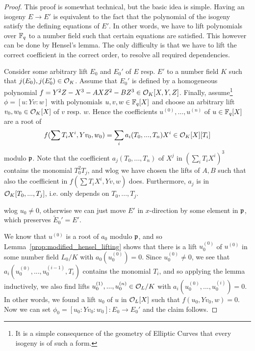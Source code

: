 \begin{proof}
    This proof is somewhat technical, but the basic idea is simple.
    Having an isogeny $E \to E'$ is equivalent to the fact that the polynomial of the isogeny satisfy the defining equations of $E'$.
    In other words, we have to lift polynomials over $\mathbb{F}_q$ to a number field such that certain equations are satisfied.
    This however can be done by Hensel's lemma.
    The only difficulty is that we have to lift the correct coefficient in the correct order, to resolve all required dependencies.

    Consider some arbitrary lift $E_0$ and $E_0'$ of $E$ resp. $E'$ to a number field $K$ such that $j(E_0), j(E_0') \in \mathcal{O}_K$.
    Assume that $E_0'$ is defined by a homogeneous polynomial $f = Y^2Z - X^3 - AXZ^2 - BZ^3 \in \mathcal{O}_K[X, Y, Z]$.
    Finally, assume\footnote{It is a simple consequence of the geometry of Elliptic Curves that every isogeny is of such a form.} $\phi = [u : Y v : w]$ with polynomials $u, v, w \in \mathbb{F}_q[X]$ and choose an arbitrary lift $v_0, w_0 \in \mathcal{O}_K[X]$ of $v$ resp. $w$.
    Hence the coefficients $u^{(0)}, ..., u^{(n)}$ of $u \in \mathbb{F}_q[X]$ are a root of
    \begin{equation*}
        f(\sum T_i X^i, Y v_0, w_0) = \sum_i a_i(T_0, ..., T_n) X^i \in \mathcal{O}_K[X][T_i]
    \end{equation*}
    modulo $\mathfrak{p}$.
    Note that the coefficient $a_j(T_0, ..., T_n)$ of $X^j$ in $(\sum_i T_i X^i)^3$ contains the monomial $T_0^2 T_j$, and 
    wlog we have chosen the lifts of $A, B$ such that also the coefficient in $f(\sum T_i X^i, Y v, w)$ does.
    Furthermore, $a_j$ is in $\mathcal{O}_K[T_0, ..., T_j]$, i.e. only depends on $T_0, ..., T_j$.

    wlog $u_0 \neq 0$, otherwise we can just move $E'$ in $x$-direction by some element in $\mathfrak{p}$, which preserves $\tilde{E}_0' = E'$.

    We know that $u^{(0)}$ is a root of $a_0$ modulo $\mathfrak{p}$, and so Lemma~\ref{prop:modified_hensel_lifting} shows that there is a lift $u^{(0)}_0$ of $u^{(0)}$ in some number field $L_0/K$ with $a_0(u^{(0)}_0) = 0$.
    Since $u_0^{(0)} \neq 0$, we see that $a_i(u_0^{(0)}, ..., u_0^{(i - 1)}, T_i)$ contains the monomial $T_i$, and so applying the lemma inductively, we also find lifts $u^{(1)}_0, ..., u^{(n)}_0 \in \mathcal{O}_L/K$ with $a_i(u^{(0)}_0, ..., u^{(i)}_0) = 0$.
    In other words, we found a lift $u_0$ of $u$ in $\mathcal{O}_L[X]$ such that $f(u_0, Y v_0, w) = 0$.
    Now we can set $\phi_0 = [u_0 : Y v_0 : w_0]: E_0 \to E_0'$ and the claim follows.
\end{proof}
